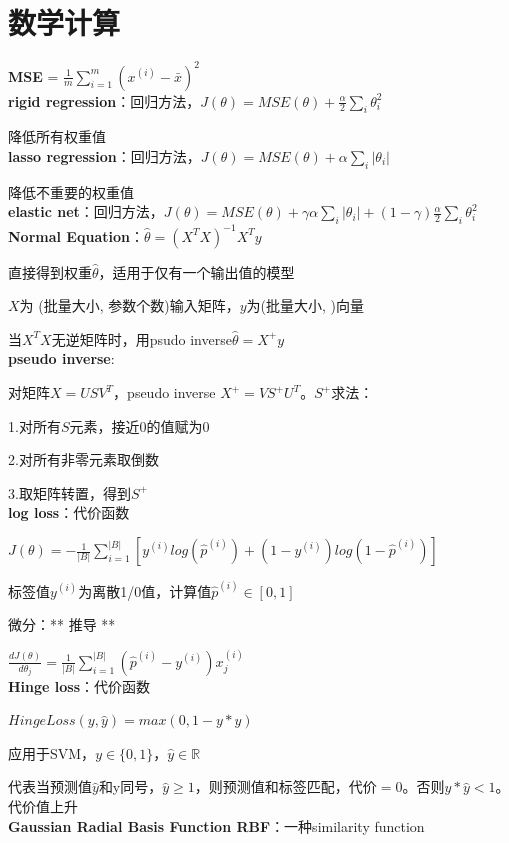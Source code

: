 \documentclass[UTF8]{ctexart}
\begin{document}
\section{数学计算}
\noindent \textbf{MSE} = $\frac{1}{m}\sum_{i=1}^{m}(x^{(i)} - \bar{x} )^2$\\
\textbf{rigid regression}：回归方法，$J(\theta) = MSE(\theta) + \frac{\alpha}{2}\sum_{i}\theta_i^2$

  降低所有权重值\\
\textbf{lasso regression}：回归方法，$J(\theta) = MSE(\theta) + \alpha \sum_i |\theta_i|$

  降低不重要的权重值\\
\textbf{elastic net}：回归方法，$J(\theta) = MSE(\theta) + \gamma\alpha \sum_i |\theta_i| + (1-\gamma)\frac{\alpha}{2}\sum_{i}\theta_i^2$\\
\textbf{Normal Equation}：$\hat{\theta} = (X^TX)^{-1}X^Ty$

  直接得到权重$\hat{\theta}$，适用于仅有一个输出值的模型

  $X$为 (批量大小, 参数个数)输入矩阵，$y$为(批量大小, )向量
  
  当$X^TX$无逆矩阵时，用psudo inverse$\hat{\theta} = X^+y$\\
\textbf{pseudo inverse}:

  对矩阵$X=USV^T$，pseudo inverse $X^+=VS^+U^T$。$S^+$求法：

  \quad 1.对所有$S$元素，接近0的值赋为0

  \quad 2.对所有非零元素取倒数

  \quad 3.取矩阵转置，得到$S^+$\\
\textbf{log loss}：代价函数

  $J(\theta) = -\frac{1}{|B|}\sum_{i=1}^{|B|}[y^{(i)}log(\hat{p}^{(i)}) + (1-y^{(i)})log(1-\hat{p}^{(i)})]$

  标签值$y^{(i)}$为离散1/0值，计算值$\hat{p}^{(i)} \in [0,1]$

  微分：** 推导 **
  
  \quad $\frac{d J(\theta)}{d \theta_j} = \frac{1}{|B|}\sum_{i=1}^{|B|}(\hat{p}^{(i)} - y^{(i)}) x_j^{(i)}$\\
\textbf{Hinge loss}：代价函数

  $HingeLoss(y, \hat{y}) = max(0, 1-y*\hat{y})$

  应用于SVM，$y \in \{0, 1\}$，$\hat{y} \in \mathbb{R} $
  
  代表当预测值$\hat{y}$和y同号，$\hat{y} \geq 1$，则预测值和标签匹配，代价$=0$。否则$y*\hat{y} < 1$。代价值上升\\
\textbf{Gaussian Radial Basis Function RBF}：一种similarity function
\end{document}
